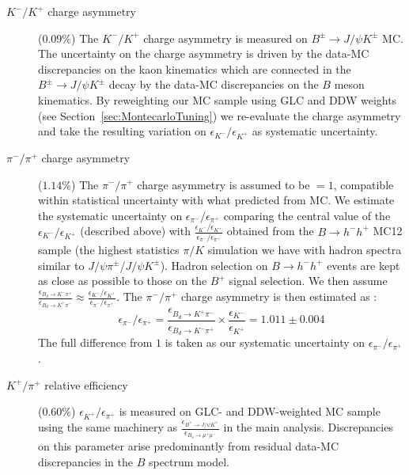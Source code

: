 \begin{description}
    \item[$K^{-}/K^{+}$ charge asymmetry\\] ($0.09\%$) The $K^{-}/K^{+}$
	charge asymmetry is measured on $B^{\pm}\to J/\psi K^{\pm}$ MC. The uncertainty
	on the charge asymmetry is driven by the data-MC discrepancies on the kaon
	kinematics which are connected in the $B^{\pm}\to J/\psi K^{\pm}$ decay
	by the data-MC discrepancies on the $B$ meson kinematics. By reweighting our
	MC sample using GLC and DDW weights (see Section~\ref{sec:MontecarloTuning}) we
	re-evaluate the charge asymmetry and take the resulting variation on
	$\epsilon_{K^{-}}/\epsilon_{K^+}$ as systematic uncertainty. 
    \item[$\pi^{-}/\pi^{+}$ charge asymmetry\\] ($1.14\%$) The $\pi^{-}/\pi^{+}$
	charge asymmetry is assumed to be $=1$, compatible within statistical uncertainty
	with what predicted from MC. We estimate the systematic uncertainty on
	$\epsilon_{\pi^{-}}/\epsilon_{\pi^{+}}$ comparing the central value of the
	$\epsilon_{K^{-}}/\epsilon_{K^+}$ (described above) with 
	$\frac{\epsilon_{K^{-}}/\epsilon_{K^+}}{\epsilon_{\pi^{-}}/\epsilon_{\pi^{+}}}$
	obtained from the $B \to h^{-} h^{+}$ MC12 sample (the highest statistics $\pi/K$
	simulation we have with hadron spectra similar to $ J/\psi \pi^{\pm}$/$ J/\psi K^{\pm}$).
	Hadron selection on $B \to h^{-} h^{+}$ events are kept as close as possible to
	those on the $B^{+}$ signal selection. We then assume
	$\frac{\epsilon_{B_{d} \to K^{-} \pi^{+}}}{\epsilon_{B_{d} \to K^{+} \pi^{-}}} 
	\approx \frac{\epsilon_{K^{-}}/\epsilon_{K^+}}{\epsilon_{\pi^{-}}/\epsilon_{\pi^{+}}}$.
	The $\pi^{-}/\pi^{+}$ charge asymmetry is then estimated as : 
	\begin{equation}
	    \epsilon_{\pi^{-}}/\epsilon_{\pi^{+}}
	    =\frac{\epsilon_{B_{d} \to K^{+} \pi^{-}}}{\epsilon_{B_{d} \to K^{-} \pi^{+}}} \times \frac{\epsilon_{K^{-}}}{\epsilon_{K^{+}}}
	    =  1.011 \pm 0.004
	\end{equation}
	The full difference from $1$ is taken as our systematic uncertainty on $\epsilon_{\pi^{-}}/\epsilon_{\pi^{+}}$.
    \item[$K^{+}/\pi^{+}$ relative efficiency] ($0.60\%$) $\epsilon_{K^{+}}/\epsilon_{\pi^{+}}$
	is measured on GLC- and DDW-weighted \BpmKpmJpsi{} MC sample using the same machinery
	as $\frac{\epsilon_{B^{+}\to J/\psi K^{+}}}{\epsilon_{B_{s} \to \mu^{+} \mu^{-}}}$
	in the main analysis. Discrepancies on this parameter arise predominantly
	from residual data-MC discrepancies in the $B$ spectrum model.
\end{description}

